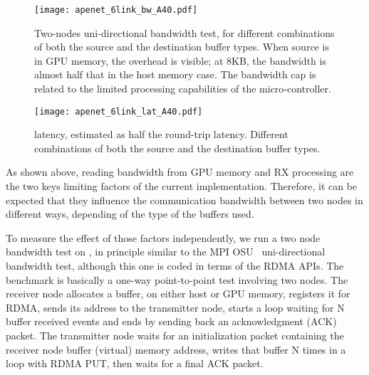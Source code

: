 \begin{figure}[t]
 \begin{minipage}[t]{0.48\textwidth}
   \centering
  \texttt{[image: apenet\_6link\_bw\_A40.pdf]}
  \caption{\mbox{Two-nodes} \mbox{uni-directional} bandwidth test, for
  different combinations of both the source and the destination buffer
  types. When source is in GPU memory, the overhead is visible; at
  8KB, the bandwidth is almost half that in the host memory case. The
  bandwidth cap is related to the limited processing capabilities of
  the \nios \mbox{micro-controller}. }
  \label{fig:apenet_bw} 
 \end{minipage}
 \hspace{3mm}
 \begin{minipage}[t]{0.48\textwidth}
 \centering
 \texttt{[image: apenet\_6link\_lat\_A40.pdf]}
 \caption{\apenetp latency, estimated as half the round-trip
  latency. Different combinations of both the source and the
  destination buffer types.}
 \label{fig:apenet_lat}
 \end{minipage}
\end{figure}


As shown above, reading bandwidth from GPU memory and RX processing
are the two keys limiting factors of the current \apenetp
implementation.
Therefore, it can be expected that they influence the communication
bandwidth between two nodes in different ways, depending of the type
of the buffers used.

To measure the effect of those factors independently, we run a two
node bandwidth test on \apenetp, in principle similar to the MPI
OSU~\cite{Traff:2012:OMB-GPU} uni-directional bandwidth test, although
this one is coded in terms of the \apenet RDMA APIs.
The benchmark is basically a one-way point-to-point test involving two
nodes. The receiver node allocates a buffer, on either host or GPU
memory, registers it for RDMA, sends its address to the transmitter
node, starts a loop waiting for N buffer received events and ends by
sending back an acknowledgment (ACK) packet.  The transmitter node
waits for an initialization packet containing the receiver node buffer
(virtual) memory address, writes that buffer N times in a loop with
RDMA PUT, then waits for a final ACK packet.

